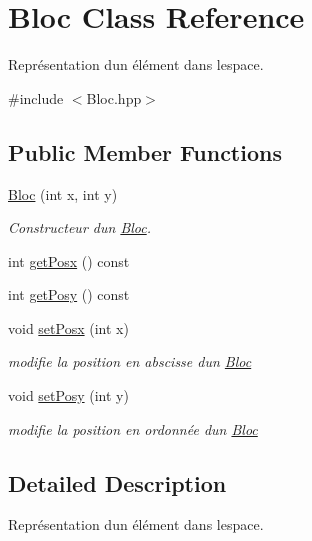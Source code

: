 \hypertarget{classBloc}{}\section{Bloc Class Reference}
\label{classBloc}


Représentation d\textquotesingle{}un élément dans l\textquotesingle{}espace.  




{\ttfamily \#include $<$Bloc.\+hpp$>$}

\subsection*{Public Member Functions}
\begin{DoxyCompactItemize}
\item 
\mbox{\label{classBloc_a67d18e588715a983cf7980ae23d9e939}} 
\hyperlink{classBloc_a67d18e588715a983cf7980ae23d9e939}{Bloc} (int x, int y)
\begin{DoxyCompactList}\small\item\em Constructeur d\textquotesingle{}un \hyperlink{classBloc}{Bloc}. \end{DoxyCompactList}\item 
int \hyperlink{classBloc_a1600764b66f921e77cb5ca8d2946a3e2}{get\+Posx} () const
\item 
int \hyperlink{classBloc_a362522a2a75cefdbba44a544cd7f1a75}{get\+Posy} () const
\item 
void \hyperlink{classBloc_a2d50fb680c5b8d3d3de2566a125d25a2}{set\+Posx} (int x)
\begin{DoxyCompactList}\small\item\em modifie la position en abscisse d\textquotesingle{}un \hyperlink{classBloc}{Bloc} \end{DoxyCompactList}\item 
void \hyperlink{classBloc_a361647f817b1f6202ee29c77e8f03f79}{set\+Posy} (int y)
\begin{DoxyCompactList}\small\item\em modifie la position en ordonnée d\textquotesingle{}un \hyperlink{classBloc}{Bloc} \end{DoxyCompactList}\end{DoxyCompactItemize}


\subsection{Detailed Description}
Représentation d\textquotesingle{}un élément dans l\textquotesingle{}espace. 

